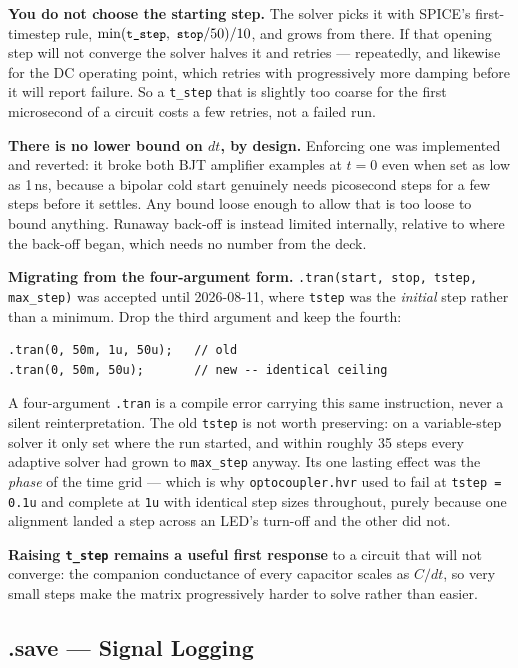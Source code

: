 \documentclass[11pt, a4paper]{article}
\newcommand{\code}[1]{\texttt{\small #1}}
\begin{document}
\textbf{You do not choose the starting step.} The solver picks it with SPICE's
first-timestep rule, \(\min(\code{t\_step},\ \code{stop}/50)/10\), and grows
from there. If that opening step will not converge the solver halves it and
retries --- repeatedly, and likewise for the DC operating point, which retries
with progressively more damping before it will report failure. So a
\code{t\_step} that is slightly too coarse for the first microsecond of a
circuit costs a few retries, not a failed run.

\textbf{There is no lower bound on \(dt\), by design.} Enforcing one was
implemented and reverted: it broke both BJT amplifier examples at \(t = 0\)
even when set as low as 1\,ns, because a bipolar cold start genuinely needs
picosecond steps for a few steps before it settles. Any bound loose enough to
allow that is too loose to bound anything. Runaway back-off is instead limited
internally, relative to where the back-off began, which needs no number from
the deck.

\textbf{Migrating from the four-argument form.} \code{.tran(start, stop, tstep,
max\_step)} was accepted until 2026-08-11, where \code{tstep} was the
\emph{initial} step rather than a minimum. Drop the third argument and keep the
fourth:

\begin{lstlisting}
.tran(0, 50m, 1u, 50u);   // old
.tran(0, 50m, 50u);       // new -- identical ceiling
\end{lstlisting}

A four-argument \code{.tran} is a compile error carrying this same instruction,
never a silent reinterpretation. The old \code{tstep} is not worth preserving:
on a variable-step solver it only set where the run started, and within roughly
35 steps every adaptive solver had grown to \code{max\_step} anyway. Its one
lasting effect was the \emph{phase} of the time grid --- which is why
\code{optocoupler.hvr} used to fail at \code{tstep = 0.1u} and complete at
\code{1u} with identical step sizes throughout, purely because one alignment
landed a step across an LED's turn-off and the other did not.

\textbf{Raising \code{t\_step} remains a useful first response} to a circuit
that will not converge: the companion conductance of every capacitor scales as
\(C/dt\), so very small steps make the matrix progressively harder to solve
rather than easier.

\subsection{.save — Signal Logging}
\end{document}
